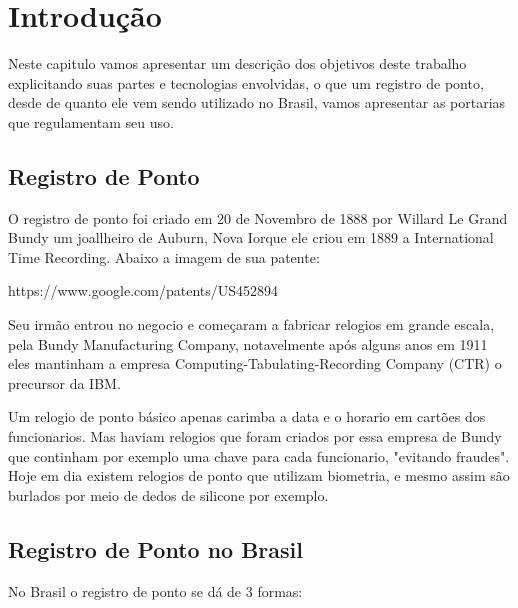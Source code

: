 \documentclass[12pt,openright,twoside,a4paper,english, brazil]{abntex2} %
\begin{document}
\listoffigures*
\cleardoublepage %
\listoftables* %
\cleardoublepage
\printterms[columns=1,style=align] %
\cleardoublepage %
\tableofcontents








\chapter{Introdução}

Neste capitulo vamos apresentar um descrição dos objetivos deste trabalho explicitando suas partes e tecnologias envolvidas, o que um registro de ponto, desde de quanto ele vem sendo utilizado no Brasil, vamos apresentar as portarias que regulamentam seu uso.

\section{Registro de Ponto}

O registro de ponto foi criado em 20 de Novembro de 1888 por Willard Le Grand Bundy um joallheiro de Auburn, Nova Iorque ele criou em 1889 a International Time Recording. Abaixo a imagem de sua patente:

https://www.google.com/patents/US452894

Seu irmão entrou no negocio e começaram a fabricar relogios em grande escala, pela Bundy Manufacturing Company, notavelmente após alguns anos em 1911 eles mantinham a empresa Computing-Tabulating-Recording Company (CTR) o precursor da IBM.

Um relogio de ponto básico apenas carimba a data e o horario em cartões dos funcionarios. Mas haviam relogios que foram criados por essa empresa de Bundy que continham por exemplo uma chave para cada funcionario, "evitando fraudes". Hoje em dia existem relogios de ponto que utilizam biometria, e mesmo assim são burlados por meio de dedos de silicone por exemplo.

\section{Registro de Ponto no Brasil}

No Brasil o registro de ponto se dá de 3 formas:
\end{document}
